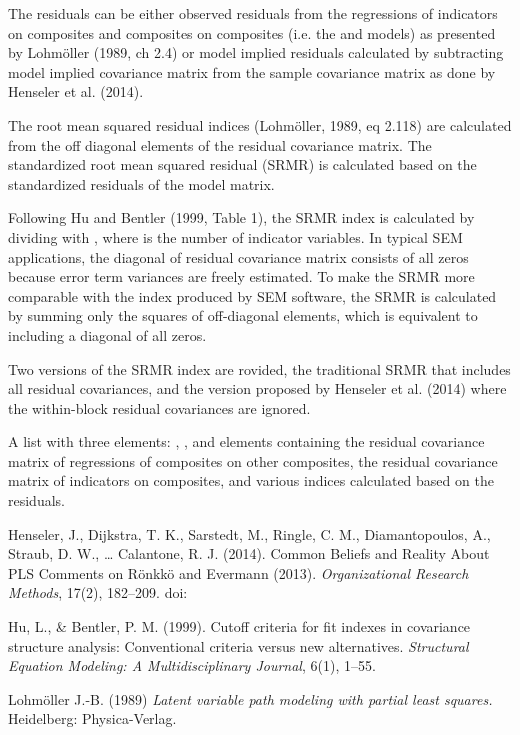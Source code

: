 \documentclass[a4paper]{book}
\begin{document}
%
\begin{Details}\relax
The residuals can be
either observed residuals from the regressions of indicators on composites and composites 
on composites
(i.e. the  and  models) as presented by Lohmöller (1989, ch 2.4) or 
model implied residuals calculated by subtracting model implied covariance matrix from the 
sample covariance matrix as done by Henseler et al. (2014). 

The root mean squared residual indices (Lohmöller, 1989, eq 2.118) are calculated from the
off diagonal elements of the residual covariance matrix. The
standardized root mean squared residual (SRMR) is calculated based on the standardized residuals
of the  model matrix. 

Following Hu and Bentler (1999, Table 1), the SRMR index is calculated by dividing with 
, where  is the number of indicator variables. In typical SEM applications,
the diagonal of residual covariance matrix consists of all zeros because error term variances
are freely estimated. To make the SRMR more comparable with the index produced by 
SEM software, the SRMR is calculated by summing only the squares of off-diagonal elements,
which is equivalent to including a diagonal of all zeros. 

Two versions of the 
SRMR index are rovided, the traditional SRMR that includes all residual covariances, and the 
version proposed by Henseler et al. (2014) where the within-block residual covariances are 
ignored.
\end{Details}
%
\begin{Value}
A list with three elements: , , and  elements
containing the residual covariance matrix of regressions of composites on other composites,
the residual covariance matrix of indicators on composites, and various indices
calculated based on the residuals.
\end{Value}
%
\begin{References}\relax
Henseler, J., Dijkstra, T. K., Sarstedt, M., Ringle, C. M., Diamantopoulos, A., Straub, D. W., …
Calantone, R. J. (2014). Common Beliefs and Reality About PLS Comments on Rönkkö and Evermann 
(2013). \emph{Organizational Research Methods}, 17(2), 182–209. doi:\nobreakspace{}

Hu, L., \& Bentler, P. M. (1999). Cutoff criteria for fit indexes in covariance structure 
analysis: Conventional criteria versus new alternatives. \emph{Structural Equation Modeling: 
A Multidisciplinary Journal}, 6(1), 1–55.

Lohmöller J.-B. (1989) \emph{Latent variable path modeling with partial
least squares.} Heidelberg: Physica-Verlag.
\end{References}
\end{document}
